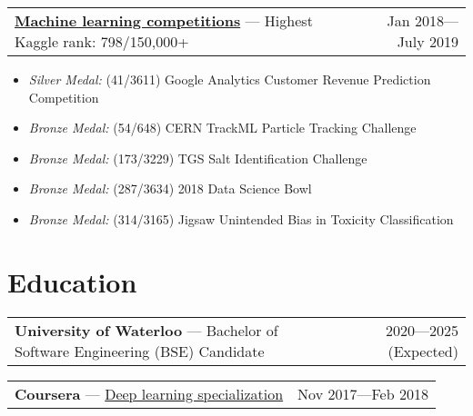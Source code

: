 \documentclass[letterpaper,11pt]{article}
\makeatletter
\newcommand{\heading}[3]{
    \begin{tabular*}{\textwidth}{l@{\extracolsep{\fill}}r}
        \textbf{#1} — #2 & #3
    \end{tabular*}
    \vspace{-1em}
}
\newcommand{\items}[1]{
    \begin{itemize}[topsep=0pt,leftmargin=1em]\itemsep0em
        #1
    \end{itemize}
}
\makeatother
\begin{document}
    \vspace{5pt}

    \heading{\href{https://www.kaggle.com/bkkaggle}{Machine learning competitions}}{Highest Kaggle rank: 798/150,000+}{Jan 2018—July 2019}
    \items{
        \item \textit{Silver Medal:} (41/3611) Google Analytics Customer Revenue Prediction Competition
        \item \textit{Bronze Medal:} (54/648) CERN TrackML Particle Tracking Challenge
        \item \textit{Bronze Medal:} (173/3229) TGS Salt Identification Challenge
        \item \textit{Bronze Medal:} (287/3634) 2018 Data Science Bowl
        \item \textit{Bronze Medal:} (314/3165) Jigsaw Unintended Bias in Toxicity Classification
    }

\vspace{10pt}

\section{Education}
    \heading{University of Waterloo}{Bachelor of Software Engineering (BSE) Candidate}{2020—2025 (Expected)}
    \vspace{7pt}
    \heading{Coursera}{\href{https://coursera.org/share/f01a288c4d93810dbfe43cba754c64c3}{Deep learning specialization}}{Nov 2017—Feb 2018}
\end{document}

